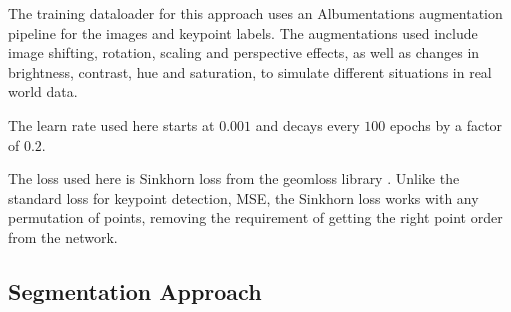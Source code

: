 \documentclass[10pt]{book}
\newcommand{\figureref}[1]{\autoref{#1}}
\begin{document}
The training dataloader for this approach uses an Albumentations augmentation pipeline for the images and keypoint labels. The augmentations used include image shifting, rotation, scaling and perspective effects, as well as changes in brightness, contrast, hue and saturation, to simulate different situations in real world data. 

The learn rate used here starts at $0.001$ and decays every $100$ epochs by a factor of $0.2$. 


The loss used here is Sinkhorn loss from the geomloss library \cite{feydy2019interpolating}. Unlike the standard loss for keypoint detection, \ac{MSE}, the Sinkhorn loss works with any permutation of points, removing the requirement of getting the right point order from the network. 

\subsection{Segmentation Approach}
\end{document}
